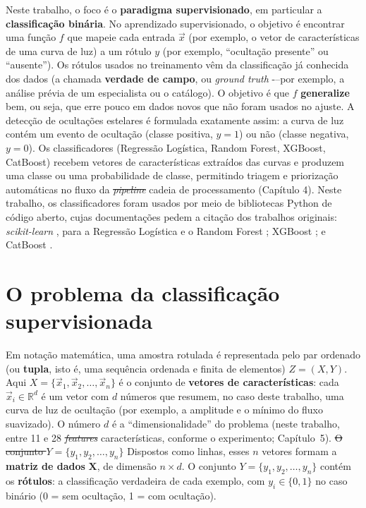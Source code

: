 \documentclass[msc]{on} %
\makeatletter
\providecommand{\DIFaddtex}[1]{{\protect\color{red}#1}} %
\providecommand{\DIFdeltex}[1]{{\protect\color{red}\sout{#1}}} %
\providecommand{\DIFaddbegin}{} %
\providecommand{\DIFaddend}{} %
\providecommand{\DIFdelbegin}{} %
\providecommand{\DIFdelend}{} %
\providecommand{\DIFadd}[1]{\texorpdfstring{\DIFaddtex{#1}}{#1}} %
\providecommand{\DIFdel}[1]{\texorpdfstring{\DIFdeltex{#1}}{}} %
\let\sout@orig\sout %
\renewcommand{\sout}[1]{\ifmmode\text{\sout@orig{\ensuremath{#1}}}\else\sout@orig{#1}\fi} %
\makeatother
\begin{document}
Neste trabalho, o foco é o \textbf{paradigma supervisionado}, em particular a \textbf{classificação binária}. No aprendizado supervisionado, o objetivo é encontrar uma função \(f\) que mapeie cada entrada \(\vec{x}\) (por exemplo, o vetor de características de uma curva de luz) a um rótulo \(y\) (por exemplo, ``ocultação presente'' ou ``ausente''). Os rótulos usados no treinamento vêm da classificação já conhecida dos dados (a chamada \textbf{verdade de campo}, ou \textit{ground truth} -\DIFaddbegin \DIFadd{--}\DIFaddend  por exemplo, a análise prévia de um especialista ou o catálogo). O objetivo é que \(f\) \textbf{generalize} bem, ou seja, que erre pouco em dados novos que não foram usados no ajuste. A detecção de ocultações estelares é formulada exatamente assim: a curva de luz contém um evento de ocultação (classe positiva, \(y=1\)) ou não (classe negativa, \(y=0\)). Os classificadores (Regressão Logística, Random Forest, XGBoost, CatBoost) recebem vetores de características extraídos das curvas e produzem uma classe ou uma probabilidade de classe, permitindo triagem e priorização automáticas no fluxo da \DIFdelbegin \textit{\DIFdel{pipeline}} %
\DIFdelend\ifhmode\hskip0pt\fi \DIFaddbegin \DIFadd{cadeia de processamento }\DIFaddend (Capítulo 4). Neste trabalho, os classificadores foram usados por meio de bibliotecas Python de código aberto, cujas documentações pedem a citação dos trabalhos originais: \textit{scikit-learn} \citep{ScikitLearn2011}, para a Regressão Logística e o Random Forest \citep{Breiman2001}; XGBoost \citep{Chen2016}; e CatBoost \citep{Prokhorenkova2018}.

\section{O problema da classificação supervisionada}
\label{sec:problema_classificacao}
\label{sec:reglin_didatica}

Em notação matemática, uma amostra rotulada é representada pelo par ordenado (ou \textbf{tupla}, isto é, uma sequência ordenada e finita de elementos) \(Z = (X, Y)\). Aqui \(X = \{\vec{x}_1, \vec{x}_2, \ldots, \vec{x}_n\}\) é o conjunto de \textbf{vetores de características}: cada \(\vec{x}_i \in \mathbb{R}^d\) é um vetor com \(d\) números que resumem, no caso deste trabalho, uma curva de luz de ocultação (por exemplo, a amplitude e o mínimo do fluxo suavizado). O número \(d\) é a ``dimensionalidade'' do problema (neste trabalho, entre 11 e 28 \DIFdelbegin \textit{\DIFdel{features}}%
\DIFdelend\ifhmode\hskip0pt\fi \DIFaddbegin \DIFadd{características}\DIFaddend , conforme o experimento; Capítulo~5). \DIFdelbegin \DIFdel{O conjunto \(Y = \{y_1, y_2, \ldots, y_n\}\) }\DIFdelend\ifhmode\hskip0pt\fi \DIFaddbegin \DIFadd{Dispostos como linhas, esses \(n\) vetores formam a }\textbf{\DIFadd{matriz de dados}} \DIFadd{\(\mathbf{X}\), de dimensão \(n \times d\). O conjunto \(Y =\{y_1, y_2, \ldots, y_n\}\) }\DIFaddend contém os \textbf{rótulos}: a classificação verdadeira de cada exemplo, com \(y_i \in \{0,1\}\) no caso binário (0 = sem ocultação, 1 = com ocultação).
\end{document}
